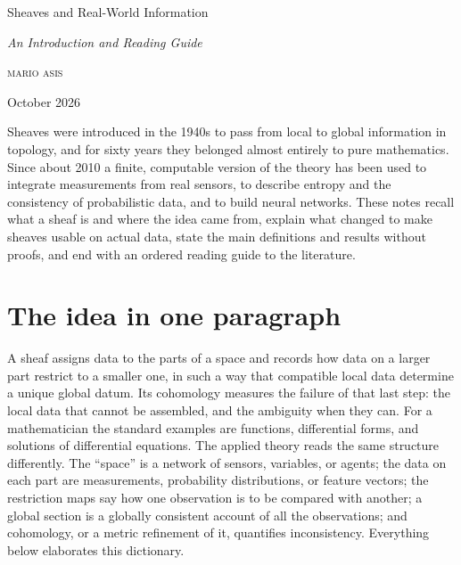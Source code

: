 \documentclass[11pt,a4paper,oneside]{scrartcl}
\theoremstyle{guideplain}
\theoremstyle{guidedef}
\begin{document}
\thispagestyle{plain.scrheadings}
\begin{center}
  \vspace*{.2\baselineskip}
  {\LARGE Sheaves and Real-World Information\par}
  \vspace{.7\baselineskip}
  {\large\itshape An Introduction and Reading Guide\par}
  \vspace{1.4\baselineskip}
  {\scshape \MakeLowercase{Mario Asis}\par}
  \vspace{.3\baselineskip}
  {\small October 2026\par}
  \vspace{1.6\baselineskip}
\end{center}

\begin{center}
\begin{minipage}{26pc}
  \small
  \enspace
  Sheaves were introduced in the 1940s to pass from local to global information in topology, and
  for sixty years they belonged almost entirely to pure mathematics. Since about 2010 a finite,
  computable version of the theory has been used to integrate measurements from real sensors, to
  describe entropy and the consistency of probabilistic data, and to build neural networks. These
  notes recall what a sheaf is and where the idea came from, explain what changed to make sheaves
  usable on actual data, state the main definitions and results without proofs, and end with an
  ordered reading guide to the literature.
\end{minipage}
\end{center}
\vspace{.8\baselineskip}

{\small\setcounter{tocdepth}{1}\renewcommand{\contentsname}{\normalsize\scshape contents}\tableofcontents}

\section{The idea in one paragraph}\label{sec:idea}

A sheaf assigns data to the parts of a space and records how data on a larger part restrict to a
smaller one, in such a way that compatible local data determine a unique global datum. Its
cohomology measures the failure of that last step: the local data that cannot be assembled, and the
ambiguity when they can. For a mathematician the standard examples are functions, differential forms,
and solutions of differential equations. The applied theory reads the same structure differently.
The \enquote{space} is a network of sensors, variables, or agents; the data on each part are
measurements, probability distributions, or feature vectors; the restriction maps say how one
observation is to be compared with another; a global section is a globally consistent account of all
the observations; and cohomology, or a metric refinement of it, quantifies inconsistency. Everything
below elaborates this dictionary.
\end{document}

